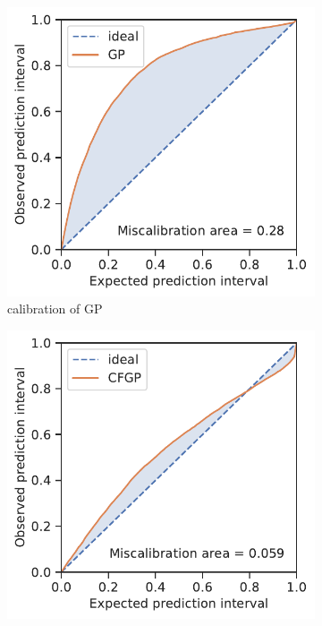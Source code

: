 \documentclass[]{achemso}
\begin{document}
\begin{figure}
\begin{subfigure}[b]{0.32\textwidth}
        \includegraphics[width=\textwidth]{../GP/Matern/calibration.pdf}
        \caption{calibration of \gls{GP}}\label{fig:calibration_example_gp}
    \end{subfigure}
    \begin{subfigure}[b]{0.32\textwidth}
        \includegraphics[width=\textwidth]{../CFGP/Matern/calibration.pdf}

\end{subfigure}
\end{figure}
\end{document}
